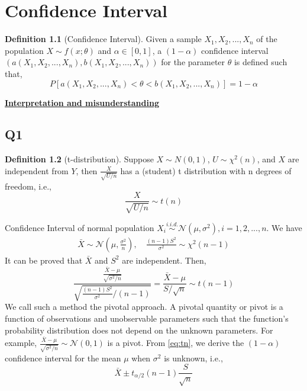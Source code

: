 \documentclass[
]{book}
\theoremstyle{definition}
\newtheorem{definition}{Definition}[chapter]
\theoremstyle{definition}
\theoremstyle{definition}
\theoremstyle{remark}
\begin{document}
\hypertarget{confidence-interval}{%
\chapter{Confidence Interval}\label{confidence-interval}}

\begin{definition}[Confidence Interval]
\protect\hypertarget{def:unnamed-chunk-4}{}{\label{def:unnamed-chunk-4} \iffalse (Confidence Interval) \fi{} }Given a sample \(X_1,X_2,...,X_n\) of the population \(X\sim f(x;\theta)\) and \(\alpha\in[0,1]\), a \((1-\alpha)\) confidence interval \(\left(a(X_1,X_2,...,X_n), b(X_1,X_2,...,X_n)\right)\) for the parameter \(\theta\) is defined such that,
\begin{equation}
P\left[a(X_1,X_2,...,X_n)< \theta <b(X_1,X_2,...,X_n)\right] = 1-\alpha
\end{equation}
\end{definition}

\textbf{\href{https://en.wikipedia.org/wiki/Confidence_interval\#Meaning_and_interpretation}{Interpretation and misunderstanding}}

\hypertarget{q1}{%
\section{Q1}\label{q1}}

\begin{definition}[t-distribution]
\protect\hypertarget{def:unnamed-chunk-5}{}{\label{def:unnamed-chunk-5} \iffalse (t-distribution) \fi{} }Suppose \(X\sim N(0, 1)\), \(U\sim \chi^2(n)\), and \(X\) are independent from \(Y\), then
\(\frac{X}{\sqrt{U/n}}\) has a (student) t distribution with n degrees of freedom, i.e.,
\[
  \frac{X}{\sqrt{U/n}} \sim t(n)
\]
\end{definition}

Confidence Interval of normal population \(X_i\stackrel{i.i.d.}\sim \mathcal{N}(\mu,\sigma^2),i=1,2,...,n\). We have
\begin{align}
\bar X \sim \mathcal{N}(\mu,\frac{\sigma^2}{n}), \quad \frac{(n-1)S^2}{\sigma^2}\sim \chi^2(n-1)
\end{align}
It can be proved that \(\bar X\) and \(S^2\) are independent. Then,
\begin{equation}
\frac{\frac{\bar X - \mu}{\sqrt{\sigma^2/n}}}{\sqrt{\frac{(n-1)S^2}{\sigma^2} / (n-1)}} = \frac{\bar X -\mu}{S/\sqrt{n}}\sim t(n-1)
\label{eq:tn}
\end{equation}
We call such a method the pivotal approach. A pivotal quantity or pivot is a function of observations and unobservable parameters such that the function's probability distribution does not depend on the unknown parameters. For example, \(\frac{\bar X - \mu}{\sqrt{\sigma^2/n}}\sim \mathcal{N}(0,1)\) is a pivot. From \eqref{eq:tn}, we derive the \((1-\alpha)\) confidence interval for the mean \(\mu\) when \(\sigma^2\) is unknown, i.e.,
\begin{equation}
\bar X \pm t_{\alpha/2}(n-1)\frac{S}{\sqrt{n}}
\end{equation}
\end{document}
